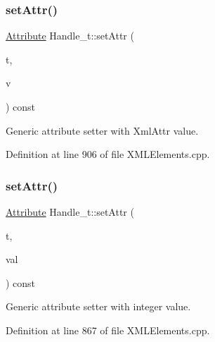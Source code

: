 \subsubsection{\texorpdfstring{set\+Attr()}{setAttr()}\hspace{0.1cm}{\footnotesize\ttfamily [2/8]}}
{\footnotesize\ttfamily \hyperlink{namespace_d_d4hep_1_1_x_m_l_a5c19b7116be99d69b4b22d911357baaf}{Attribute} Handle\+\_\+t\+::set\+Attr (\begin{DoxyParamCaption}\item[{const \hyperlink{namespace_d_d4hep_1_1_x_m_l_a09e5d9cc86ed782f6826dfe0778c1815}{Xml\+Char} $\ast$}]{t,  }\item[{const \hyperlink{namespace_d_d4hep_1_1_x_m_l_a5c19b7116be99d69b4b22d911357baaf}{Attribute}}]{v }\end{DoxyParamCaption}) const}



Generic attribute setter with Xml\+Attr value. 



Definition at line 906 of file X\+M\+L\+Elements.\+cpp.

\hypertarget{class_d_d4hep_1_1_x_m_l_1_1_handle__t_abe759dd5af5ba95d05a0d4ed06f5bd9b}{}\label{class_d_d4hep_1_1_x_m_l_1_1_handle__t_abe759dd5af5ba95d05a0d4ed06f5bd9b} 
\subsubsection{\texorpdfstring{set\+Attr()}{setAttr()}\hspace{0.1cm}{\footnotesize\ttfamily [3/8]}}
{\footnotesize\ttfamily \hyperlink{namespace_d_d4hep_1_1_x_m_l_a5c19b7116be99d69b4b22d911357baaf}{Attribute} Handle\+\_\+t\+::set\+Attr (\begin{DoxyParamCaption}\item[{const \hyperlink{namespace_d_d4hep_1_1_x_m_l_a09e5d9cc86ed782f6826dfe0778c1815}{Xml\+Char} $\ast$}]{t,  }\item[{int}]{val }\end{DoxyParamCaption}) const}



Generic attribute setter with integer value. 



Definition at line 867 of file X\+M\+L\+Elements.\+cpp.

